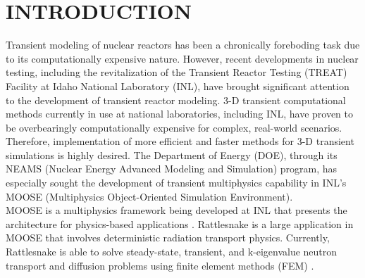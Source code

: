 %
%
%



\pagestyle{plain} %
\setcounter{page}{1}


\chapter{\uppercase{Introduction}}

Transient modeling of nuclear reactors has been a chronically foreboding task due to its computationally expensive nature.  However, recent developments in nuclear testing, including the revitalization of the Transient Reactor Testing (TREAT) Facility at Idaho National Laboratory (INL), have brought significant attention to the development of transient reactor modeling.  3-D transient computational methods currently in use at national laboratories, including INL, have proven to be overbearingly computationally expensive for complex, real-world scenarios.  Therefore, implementation of more efficient and faster methods for 3-D transient simulations is highly desired.  The Department of Energy (DOE), through its NEAMS (Nuclear Energy Advanced Modeling and Simulation) program, has especially sought the development of transient multiphysics capability in INL's MOOSE (Multiphysics Object-Oriented Simulation Environment).  \\

MOOSE is a multiphysics framework being developed at INL that presents the architecture for physics-based applications \cite{moose}.  Rattlesnake is a large application in MOOSE that involves deterministic radiation transport physics.  Currently, Rattlesnake is able to solve steady-state, transient, and k-eigenvalue neutron transport and diffusion problems using finite element methods (FEM) \cite{wang2013}. \\


